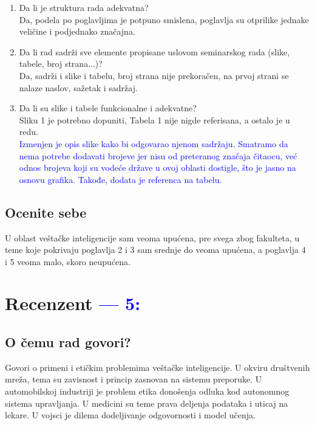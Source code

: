 \documentclass[a4paper]{report}
\newcommand{\odgovor}[1]{\textcolor{blue}{#1}}
\begin{document}
\begin{enumerate}
\item Da li je struktura rada adekvatna?\\
Da, podela po poglavljima je potpuno smislena, poglavlja su otprilike jednake veličine i podjednako značajna.

\item Da li rad sadrži sve elemente propisane uslovom seminarskog rada (slike, tabele, broj strana...)?\\
Da, sadrži i slike i tabelu, broj strana nije prekoračen, na prvoj strani se nalaze naslov, sažetak i sadržaj. 

\item Da li su slike i tabele funkcionalne i adekvatne?\\
Sliku 1 je potrebno dopuniti, Tabela 1 nije nigde referisana, a ostalo je u redu. \\
\odgovor{Izmenjen je opis slike kako bi odgovarao njenom sadržaju. Smatramo da nema potrebe dodavati brojeve jer nisu od preteranog značaja čitaocu, već odnos brojeva koji su vodeće države u ovoj oblasti dostigle, što je jasno na osnovu grafika. Takođe, dodata je referenca na tabelu.}
\end{enumerate}

\section{Ocenite sebe}
U oblast veštačke inteligencije sam veoma upućena, pre svega zbog fakulteta, u teme koje pokrivaju poglavlja 2 i 3 sam srednje do veoma upućena, a poglavlja 4 i 5 veoma malo, skoro neupućena. 


\chapter{Recenzent \odgovor{--- 5:} }


\section{O čemu rad govori?}

Govori o primeni i etičkim problemima veštačke inteligencije. U okviru društvenih mreža, tema su zavisnost i princip zasnovan na sistemu preporuke. U automobilskoj industriji je problem etika donošenja odluka kod autonomnog sistema upravljanja. U medicini su teme prava deljenja podataka i uticaj na lekare. U vojsci je dilema dodeljivanje odgovornosti i model učenja.
\end{document}
